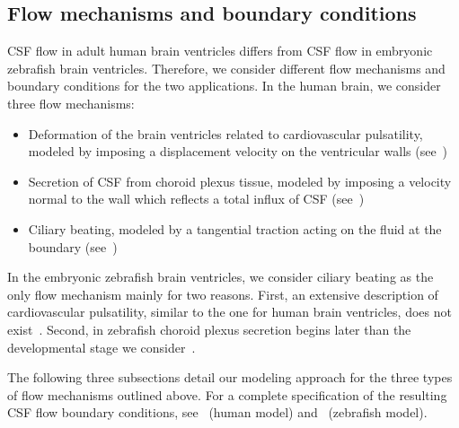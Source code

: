 \documentclass{template}
\begin{document}
\subsection{Flow mechanisms and boundary conditions}
CSF flow in adult human brain ventricles differs from CSF flow in embryonic
zebrafish brain ventricles. Therefore, we consider different flow mechanisms
and boundary conditions for the two applications.
In the human brain, we consider three flow mechanisms:
\begin{itemize}
    \item Deformation of the brain ventricles related to cardiovascular pulsatility,
    modeled by imposing a displacement velocity
    on the ventricular walls (see~)
    \item Secretion of CSF from choroid plexus tissue,
    modeled by imposing a velocity normal to the wall
    which reflects a total influx of CSF (see~)
    \item Ciliary beating, modeled by a tangential traction
    acting on the fluid at the boundary (see~)
\end{itemize}

In the embryonic zebrafish brain ventricles, we consider ciliary beating as
the only flow mechanism mainly for two reasons. First, an extensive description
of cardiovascular pulsatility, similar to the one for human brain ventricles,
does not exist~\citep{Herlyng2025AdvectionDiffusion}.
Second, in zebrafish choroid plexus secretion begins later than 
the developmental stage we consider~\citep{bill2008development}. 

The following three subsections detail our modeling approach for the three
types of flow mechanisms outlined above. For a complete specification of
the resulting CSF flow boundary conditions, see~ (human model)
and~ (zebrafish model).
\end{document}
